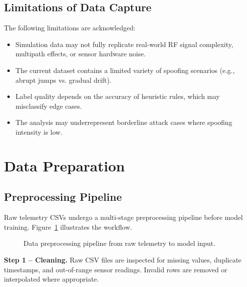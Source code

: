 \documentclass[11pt,a4paper]{article}
\begin{document}
\subsection{Limitations of Data Capture}

The following limitations are acknowledged:
\begin{itemize}
    \item Simulation data may not fully replicate real-world RF signal complexity, multipath effects, or sensor hardware noise.
    \item The current dataset contains a limited variety of spoofing scenarios (e.g., abrupt jumps vs. gradual drift).
    \item Label quality depends on the accuracy of heuristic rules, which may misclassify edge cases.
    \item The analysis may underrepresent borderline attack cases where spoofing intensity is low.
\end{itemize}

\section{Data Preparation}

\subsection{Preprocessing Pipeline}

Raw telemetry CSVs undergo a multi-stage preprocessing pipeline before model training. Figure~\ref{fig:pipeline} illustrates the workflow.

\begin{figure}[H]
\centering
{}
\caption{Data preprocessing pipeline from raw telemetry to model input.}
\label{fig:pipeline}
\end{figure}

\textbf{Step 1 -- Cleaning.} Raw CSV files are inspected for missing values, duplicate timestamps, and out-of-range sensor readings. Invalid rows are removed or interpolated where appropriate.
\end{document}
